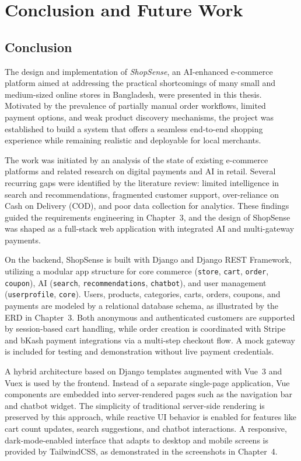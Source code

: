 \chapter{Conclusion and Future Work}

\section{Conclusion}

The design and implementation of \textit{ShopSense}, an AI-enhanced e-commerce platform aimed at addressing the practical shortcomings of many small and medium-sized online stores in Bangladesh, were presented in this thesis. Motivated by the prevalence of partially manual order workflows, limited payment options, and weak product discovery mechanisms, the project was established to build a system that offers a seamless end-to-end shopping experience while remaining realistic and deployable for local merchants.

The work was initiated by an analysis of the state of existing e-commerce platforms and related research on digital payments and AI in retail. Several recurring gaps were identified by the literature review: limited intelligence in search and recommendations, fragmented customer support, over-reliance on Cash on Delivery (COD), and poor data collection for analytics. These findings guided the requirements engineering in Chapter~3, and the design of ShopSense was shaped as a full-stack web application with integrated AI and multi-gateway payments.

On the backend, ShopSense is built with Django and Django REST Framework, utilizing a modular app structure for core commerce (\texttt{store}, \texttt{cart}, \texttt{order}, \texttt{coupon}), AI (\texttt{search}, \texttt{recommendations}, \texttt{chatbot}), and user management (\texttt{userprofile}, \texttt{core}). Users, products, categories, carts, orders, coupons, and payments are modeled by a relational database schema, as illustrated by the ERD in Chapter~3. Both anonymous and authenticated customers are supported by session-based cart handling, while order creation is coordinated with Stripe and bKash payment integrations via a multi-step checkout flow. A mock gateway is included for testing and demonstration without live payment credentials.

A hybrid architecture based on Django templates augmented with Vue~3 and Vuex is used by the frontend. Instead of a separate single-page application, Vue components are embedded into server-rendered pages such as the navigation bar and chatbot widget. The simplicity of traditional server-side rendering is preserved by this approach, while reactive UI behavior is enabled for features like cart count updates, search suggestions, and chatbot interactions. A responsive, dark-mode-enabled interface that adapts to desktop and mobile screens is provided by TailwindCSS, as demonstrated in the screenshots in Chapter~4.

